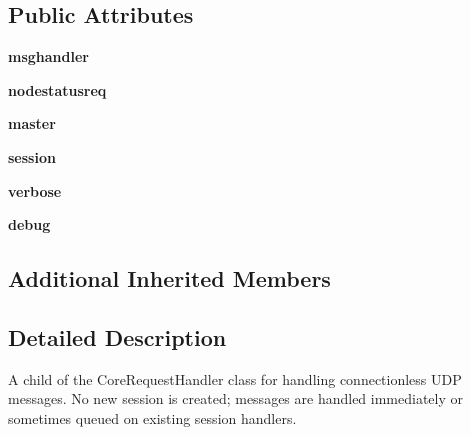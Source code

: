 \subsection*{Public Attributes}
\begin{DoxyCompactItemize}
\item 
\hypertarget{classcore_1_1coreserver_1_1_core_datagram_request_handler_a3878453b30acefc7c6697537e49b31a5}{{\bfseries msghandler}}\label{classcore_1_1coreserver_1_1_core_datagram_request_handler_a3878453b30acefc7c6697537e49b31a5}

\item 
\hypertarget{classcore_1_1coreserver_1_1_core_datagram_request_handler_aa79e143f7faf1aef236390e7db5a14ce}{{\bfseries nodestatusreq}}\label{classcore_1_1coreserver_1_1_core_datagram_request_handler_aa79e143f7faf1aef236390e7db5a14ce}

\item 
\hypertarget{classcore_1_1coreserver_1_1_core_datagram_request_handler_a603af91f186655d572e589138aa52b60}{{\bfseries master}}\label{classcore_1_1coreserver_1_1_core_datagram_request_handler_a603af91f186655d572e589138aa52b60}

\item 
\hypertarget{classcore_1_1coreserver_1_1_core_datagram_request_handler_aa3b588dc69a537ebab64c5dc96a71282}{{\bfseries session}}\label{classcore_1_1coreserver_1_1_core_datagram_request_handler_aa3b588dc69a537ebab64c5dc96a71282}

\item 
\hypertarget{classcore_1_1coreserver_1_1_core_datagram_request_handler_a6cd2cb7b22dc0af8adf4810d851e4e64}{{\bfseries verbose}}\label{classcore_1_1coreserver_1_1_core_datagram_request_handler_a6cd2cb7b22dc0af8adf4810d851e4e64}

\item 
\hypertarget{classcore_1_1coreserver_1_1_core_datagram_request_handler_ae2a0ccd273a2c1fa877e254e6362d0c4}{{\bfseries debug}}\label{classcore_1_1coreserver_1_1_core_datagram_request_handler_ae2a0ccd273a2c1fa877e254e6362d0c4}

\end{DoxyCompactItemize}
\subsection*{Additional Inherited Members}


\subsection{Detailed Description}
\begin{DoxyVerb}A child of the CoreRequestHandler class for handling connectionless
UDP messages. No new session is created; messages are handled immediately or
sometimes queued on existing session handlers.
\end{DoxyVerb}
 

